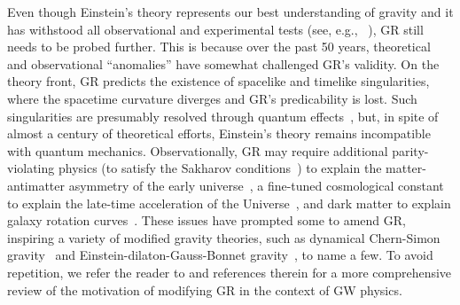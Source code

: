 \documentclass[aps,prx,amsmath,floats,floatfix,twocolumn,
  superscriptaddress,nofootinbib,showpacs]{revtex4-1}
\begin{document}
Even though Einstein's theory represents our best understanding of gravity and it has withstood all observational and experimental tests (see, e.g., ~\cite{Will2014,Stairs2003,Wex:2020ald,Yunes:2013dva,Will2014,Yagi:2016jml,Berti:2018cxi,Nair:2019iur,Berti:2018vdi}), GR still needs to be probed further.   
This is because over the past 50 years, theoretical and observational ``anomalies'' have somewhat challenged GR's validity.
On the theory front, GR predicts the existence of spacelike and timelike singularities, where the spacetime curvature diverges and GR's predicability is lost.
Such singularities are presumably resolved through quantum effects~\cite{Hawking:2015qqa, Almheiri:2019qdq, Giddings:1995gd, Preskill:1992tc, Kanitscheider:2007wq, Bena:2016ypk}, but, in spite of almost a century of theoretical efforts, Einstein's theory remains incompatible with quantum mechanics. 
Observationally, GR may require additional parity-violating physics (to satisfy the Sakharov conditions~\cite{Sakharov:1967dj}) to explain the matter-antimatter asymmetry of the early universe~\cite{Petraki:2013wwa, Gell-Mann:1991kdm, Alexander:2004us}, a fine-tuned cosmological constant~\cite{Nojiri:2006ri, Tsujikawa:2010zza} to explain the late-time acceleration of the Universe~\cite{late_time_acceleration_01, late_time_acceleration_02}, and dark matter to explain galaxy rotation curves~\cite{rotation_curve_01, rotation_curve_02}. 
These issues have prompted some to amend GR, inspiring a variety of modified gravity theories, such as dynamical Chern-Simon gravity~\cite{dCS_01, dCS_02, dCS_03} and Einstein-dilaton-Gauss-Bonnet gravity~\cite{EdGB_01, EdGB_02, EdGB_03, EdGB_04}, to name a few. 
To avoid repetition, we refer the reader to \cite{Chung:2023zdq} and references therein for a more comprehensive review of the motivation of modifying GR in the context of GW physics.
\end{document}
